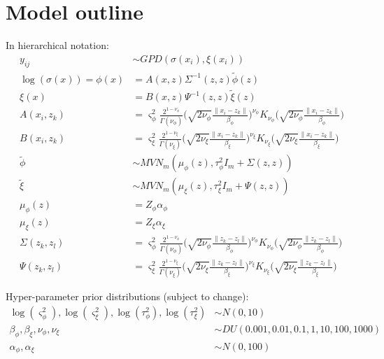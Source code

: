 \documentclass{article}
\begin{document}
\section{Model outline} \label{outline}

In hierarchical notation:
\begin{align*}
y_{ij} &\sim GPD(\sigma(x_i), \xi(x_i)) \\
\log (\sigma (x)) = \phi(x) &= A(x, z) \Sigma^{-1}(z,z) \tilde{\phi}(z) \\
\xi (x) &= B(x, z) \Psi^{-1}(z,z) \tilde{\xi}(z) \\
A(x_i, z_k) &= \varsigma_\phi^2 \frac{2^{1-\nu_\phi}}{\Gamma(\nu_\phi)}\Bigg(\sqrt{2\nu_\phi}\frac{\|x_i - z_k\|}{\beta_\phi}\Bigg)^{\nu_\phi} K_{\nu_\phi}\Bigg(\sqrt{2\nu_\phi}\frac{\|x_i - z_k\|}{\beta_\phi}\Bigg)\\
B(x_i, z_k) &= \varsigma_\xi^2 \frac{2^{1-\nu_\xi}}{\Gamma(\nu_\xi)}\Bigg(\sqrt{2\nu_\xi}\frac{\|x_i - z_k\|}{\beta_\xi}\Bigg)^{\nu_\xi} K_{\nu_\xi}\Bigg(\sqrt{2\nu_\xi}\frac{\|x_i - z_k\|}{\beta_\xi}\Bigg)\\
\tilde{\phi} &\sim MVN_m(\mu_\phi(z), \tau_\phi^2 I_m + \Sigma(z, z))\\
\tilde{\xi} &\sim MVN_m(\mu_\xi(z), \tau_\xi^2 I_m + \Psi(z, z))\\
\mu_\phi(z) &= Z_\phi \alpha_\phi \\
\mu_\xi(z) &= Z_\xi \alpha_\xi \\
\Sigma(z_k, z_l) &= \varsigma_\phi^2 \frac{2^{1-\nu_\phi}}{\Gamma(\nu_\phi)}\Bigg(\sqrt{2\nu_\phi}\frac{\|z_k - z_l\|}{\beta_\phi}\Bigg)^{\nu_\phi} K_{\nu_\phi}\Bigg(\sqrt{2\nu_\phi}\frac{\|z_k - z_l\|}{\beta_\phi}\Bigg)\\
\Psi(z_k, z_l) &= \varsigma_\xi^2 \frac{2^{1-\nu_\xi}}{\Gamma(\nu_\xi)}\Bigg(\sqrt{2\nu_\xi}\frac{\|z_k - z_l\|}{\beta_\xi}\Bigg)^{\nu_\xi} K_{\nu_\xi}\Bigg(\sqrt{2\nu_\xi}\frac{\|z_k - z_l\|}{\beta_\xi}\Bigg)
\end{align*}

Hyper-parameter prior distributions (subject to change):
\begin{align*}
\log(\varsigma^2_\phi), \log(\varsigma^2_\xi), \log(\tau^2_\phi), \log(\tau^2_\xi) &\sim N(0, 10) \\
\beta_\phi, \beta_\xi, \nu_\phi, \nu_\xi &\sim DU(0.001, 0.01, 0.1, 1, 10, 100, 1000)\\
\alpha_\phi, \alpha_\xi &\sim N(0, 100)\\
\end{align*}
\end{document}
